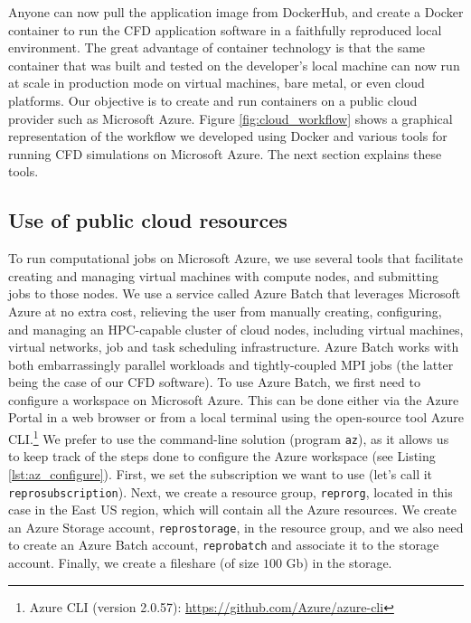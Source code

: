 \documentclass[10pt,journal,compsoc]{IEEEtran}
\begin{document}
\noindent Anyone can now pull the application image from DockerHub, and create a Docker container to run the CFD application software in a faithfully reproduced local environment.
The great advantage of container technology is that the same container that was built and tested on the developer's local machine can now run at scale in production mode on virtual machines, bare metal, or even cloud platforms.
Our objective is to create and run containers on a public cloud provider such as Microsoft Azure.
Figure \ref{fig:cloud_workflow} shows a graphical representation of the workflow we developed using Docker and various tools for running CFD simulations on Microsoft Azure.
The next section explains these tools. 

\subsection{Use of public cloud resources}

To run computational jobs on Microsoft Azure, we use several tools that facilitate creating and managing virtual machines with compute nodes, and submitting jobs to those nodes.
We use a service called Azure Batch that leverages Microsoft Azure at no extra cost, relieving the user from manually creating, configuring, and managing an HPC-capable cluster of cloud nodes, including virtual machines, virtual networks, job and task scheduling infrastructure.
Azure Batch works with both embarrassingly parallel workloads and tightly-coupled MPI jobs (the latter being the case of our CFD software).
To use Azure Batch, we first need to configure a workspace on Microsoft Azure.
This can be done either via the Azure Portal in a web browser or from a local terminal using the open-source tool Azure CLI.\footnote{Azure CLI (version 2.0.57): \url{https://github.com/Azure/azure-cli}}
We prefer to use the command-line solution (program \texttt{az}), as it allows us to keep track of the steps done to configure the Azure workspace (see Listing \ref{lst:az_configure}).
First, we set the subscription we want to use (let's call it \texttt{reprosubscription}).
Next, we create a resource group, \texttt{reprorg}, located in this case in the East US region, which will contain all the Azure resources.
We create an Azure Storage account, \texttt{reprostorage}, in the resource group,
and we also need to create an Azure Batch account, \texttt{reprobatch} and associate it to the storage account.
Finally, we create a fileshare (of size $100$ Gb) in the storage.
\end{document}
